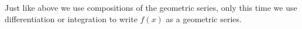 \documentclass[]{ximera}
\begin{document}
\begin{instructorNotes}
Just like above we use compositions of the geometric series, only this time we use differentiation or integration to write $f(x)$ as a geometric series.
\end{instructorNotes}
















	
	
	
	
	
	
	
	
	

	










								
				
				
	
\end{document}
